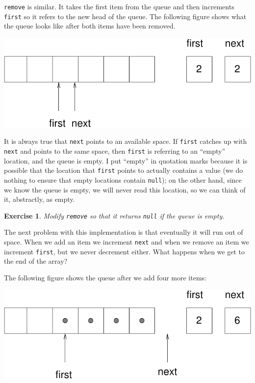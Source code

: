 \documentclass[12pt]{book}
\theoremstyle{exercise}
\newtheorem{exercise}{Exercise}[chapter]
\begin{document}
{\tt remove} is similar.  It takes the first item from the queue
and then increments {\tt first} so it refers to the new head of the queue.
The following figure shows what the queue looks like after both
items have been removed.

\includegraphics{figs/queue3.pdf}

It is always true that {\tt next} points to an available space.
If {\tt first} catches up with {\tt next} and points to the same
space, then {\tt first} is referring to an ``empty'' location,
and the queue is empty.  I put ``empty'' in quotation marks because
it is possible that the location that {\tt first} points to actually
contains a value (we do nothing to ensure that empty locations contain
{\tt null}); on the other hand, since we know the queue is empty, we
will never read this location, so we can think of it, abstractly,
as empty.

\begin{exercise}
Modify {\tt remove} so that it returns {\tt null}
if the queue is empty.
\end{exercise}

The next problem with this implementation is that eventually it
will run out of space.  When we add an item we increment {\tt next}
and when we remove an item we increment {\tt first}, but we never
decrement either.  What happens when we get to the end of the
array?

The following figure shows the queue after we add four more items:

\includegraphics{figs/queue4.pdf}
\end{document}
